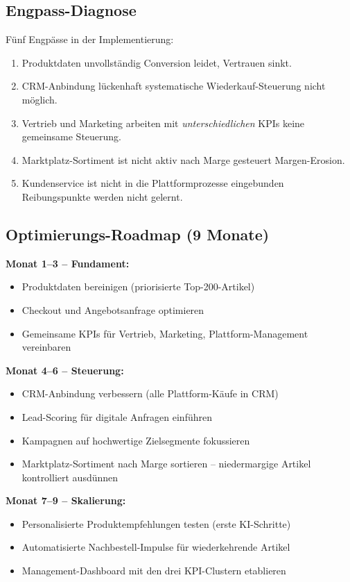 \documentclass[11pt,a4paper,oneside]{article}
\begin{document}
\subsection{Engpass-Diagnose}

Fünf Engpässe in der Implementierung:

\begin{enumerate}
  \item Produktdaten unvollständig \textrightarrow{} Conversion leidet, Vertrauen sinkt.
  \item CRM-Anbindung lückenhaft \textrightarrow{} systematische Wiederkauf-Steuerung nicht möglich.
  \item Vertrieb und Marketing arbeiten mit \emph{unterschiedlichen} KPIs \textrightarrow{} keine gemeinsame Steuerung.
  \item Marktplatz-Sortiment ist nicht aktiv nach Marge gesteuert \textrightarrow{} Margen-Erosion.
  \item Kundenservice ist nicht in die Plattform­prozesse eingebunden \textrightarrow{} Reibungspunkte werden nicht gelernt.
\end{enumerate}

\subsection{Optimierungs-Roadmap (9 Monate)}

\textbf{Monat 1--3 -- Fundament:}
\begin{itemize}
  \item Produktdaten bereinigen (priorisierte Top-200-Artikel)
  \item Checkout und Angebotsanfrage optimieren
  \item Gemeinsame KPIs für Vertrieb, Marketing, Plattform-Management vereinbaren
\end{itemize}

\textbf{Monat 4--6 -- Steuerung:}
\begin{itemize}
  \item CRM-Anbindung verbessern (alle Plattform-Käufe in CRM)
  \item Lead-Scoring für digitale Anfragen einführen
  \item Kampagnen auf hochwertige Zielsegmente fokussieren
  \item Marktplatz-Sortiment nach Marge sortieren -- niedermargige Artikel kontrolliert ausdünnen
\end{itemize}

\textbf{Monat 7--9 -- Skalierung:}
\begin{itemize}
  \item Personalisierte Produktempfehlungen testen (erste KI-Schritte)
  \item Automatisierte Nachbestell-Impulse für wiederkehrende Artikel
  \item Management-Dashboard mit den drei KPI-Clustern etablieren
\end{itemize}
\end{document}
